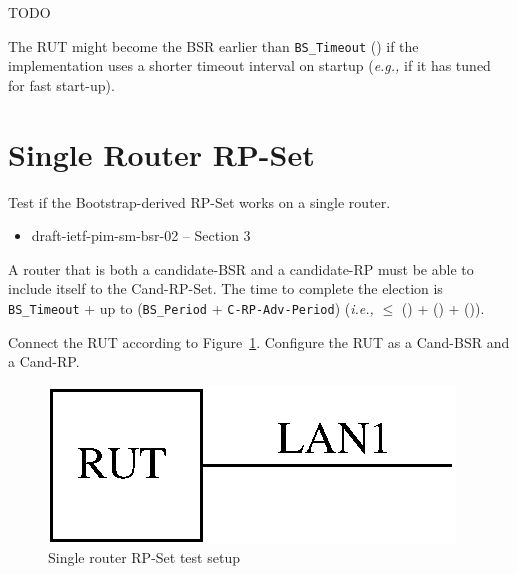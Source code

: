 \documentclass[11pt]{report}
\newcommand{\ie}{\emph{i.e.,}\xspace}
\newcommand{\eg}{\emph{e.g.,}\xspace}
\begin{document}
TODO

The RUT might become the BSR earlier than \verb=BS_Timeout= ({\PimsmBSTimeout})
if the implementation uses a shorter timeout interval on startup (\eg
if it has tuned for fast start-up).

\newpage
\section{Single Router RP-Set}
\label{sec:bootstrap_mechanism:single_router_rpset}

Test if the Bootstrap-derived RP-Set works on a single router.

\begin{itemize}

  \item draft-ietf-pim-sm-bsr-02 -- Section 3

\end{itemize}

A router that is both a candidate-BSR and a candidate-RP
must be able to include itself to the Cand-RP-Set.
The time to complete the election is
\verb=BS_Timeout= + up to (\verb=BS_Period= + \verb=C-RP-Adv-Period=) (\ie
$\leq$ ({\PimsmBSTimeout}) + ({\PimsmBSTimeout}) + ({\PimsmCRPAdvPeriod})).

Connect the RUT according to Figure~\ref{fig:single_router_rp_set}.
Configure the RUT as a Cand-BSR and a Cand-RP.

\begin{figure}[htbp]
  \begin{center}
    \includegraphics[scale=0.8]{figs/pim_test_6_2_single_router_rpset}
    \caption{Single router RP-Set test setup}
    \label{fig:single_router_rp_set}
  \end{center}
\end{figure}
\end{document}
